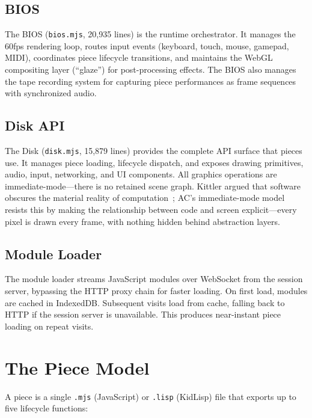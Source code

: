 \documentclass[10pt,letterpaper,twocolumn]{article}
\begin{document}
\subsection{BIOS}

The BIOS (\texttt{bios.mjs}, 20,935 lines) is the runtime orchestrator. It manages the 60fps rendering loop, routes input events (keyboard, touch, mouse, gamepad, MIDI), coordinates piece lifecycle transitions, and maintains the WebGL compositing layer (``glaze'') for post-processing effects. The BIOS also manages the tape recording system for capturing piece performances as frame sequences with synchronized audio.

\subsection{Disk API}

The Disk (\texttt{disk.mjs}, 15,879 lines) provides the complete API surface that pieces use. It manages piece loading, lifecycle dispatch, and exposes drawing primitives, audio, input, networking, and UI components. All graphics operations are immediate-mode---there is no retained scene graph. Kittler argued that software obscures the material reality of computation~\citep{kittler1995nosoftware}; AC's immediate-mode model resists this by making the relationship between code and screen explicit---every pixel is drawn every frame, with nothing hidden behind abstraction layers.

\subsection{Module Loader}

The module loader streams JavaScript modules over WebSocket from the session server, bypassing the HTTP proxy chain for faster loading. On first load, modules are cached in IndexedDB. Subsequent visits load from cache, falling back to HTTP if the session server is unavailable. This produces near-instant piece loading on repeat visits.


\section{The Piece Model}
\label{sec:pieces}

A piece is a single \texttt{.mjs} (JavaScript) or \texttt{.lisp} (KidLisp) file that exports up to five lifecycle functions:
\end{document}
